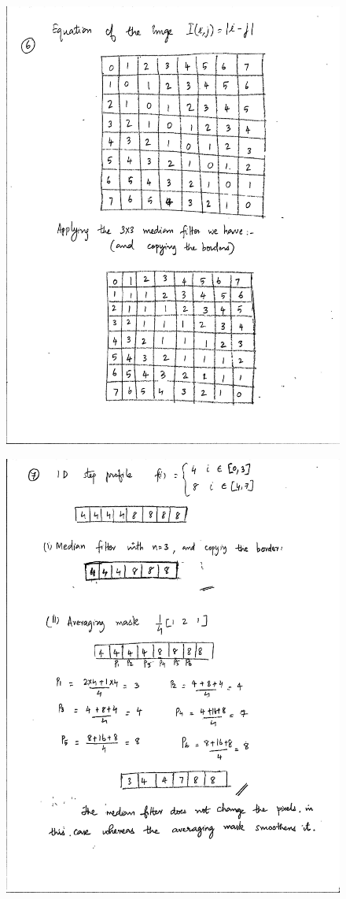 \documentclass{article}
\begin{document}
\begin{figure}
\includegraphics[width=15cm]{6.jpg}
\end{figure}

\begin{figure}
\includegraphics[width=15cm]{7.jpg}
\end{figure}
\end{document}
